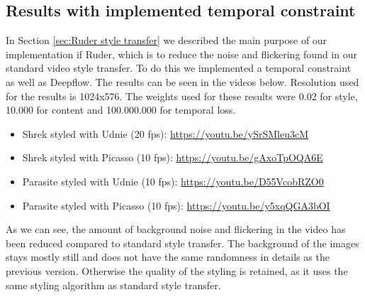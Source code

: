 \subsection{Results with implemented temporal constraint}
\label{seq:ruder_result}
In Section \ref{sec:Ruder style transfer} we described the main purpose of our implementation if Ruder, which is to reduce the noise and flickering found in our standard video style transfer. To do this we implemented a temporal constraint as well as Deepflow. The results can be seen in the videos below.\newline
Resolution used for the results is 1024x576. The weights used for these results were 0.02 for style, 10.000 for content and 100.000.000 for temporal loss. 
\begin{itemize}
\item{Shrek styled with Udnie (20 fps): \url{https://youtu.be/ySrSMleu3cM}}
\item{Shrek styled with Picasso (10 fps): \url{https://youtu.be/gAxoTpOQA6E}}
\item{Parasite styled with Udnie (10 fps): \url{https://youtu.be/D55VcobRZO0}}
\item{Parasite styled with Picasso (10 fps): \url{https://youtu.be/y5xqQGA3bOI}}
\end{itemize}
As we can see, the amount of background noise and flickering in the video has been reduced compared to standard style transfer. The background of the images stays mostly still and does not have the same randomness in details as the previous version. Otherwise the quality of the styling is retained, as it uses the same styling algorithm as standard style transfer.